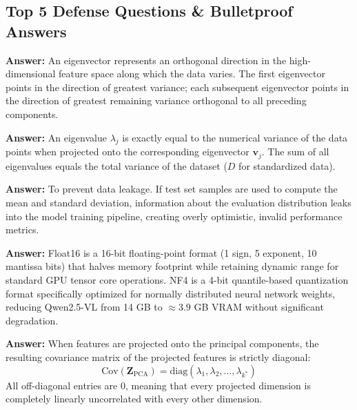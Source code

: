 \documentclass[11pt, a4paper]{article}
\begin{document}
\subsection{Top 5 Defense Questions \& Bulletproof Answers}

\begin{defensebox}
\textbf{Answer:} An eigenvector represents an orthogonal direction in the high-dimensional feature space along which the data varies. The first eigenvector points in the direction of greatest variance; each subsequent eigenvector points in the direction of greatest remaining variance orthogonal to all preceding components.
\end{defensebox}

\begin{defensebox}
\textbf{Answer:} An eigenvalue $\lambda_j$ is exactly equal to the numerical variance of the data points when projected onto the corresponding eigenvector $\mathbf{v}_j$. The sum of all eigenvalues equals the total variance of the dataset ($D$ for standardized data).
\end{defensebox}

\begin{defensebox}
\textbf{Answer:} To prevent data leakage. If test set samples are used to compute the mean and standard deviation, information about the evaluation distribution leaks into the model training pipeline, creating overly optimistic, invalid performance metrics.
\end{defensebox}

\begin{defensebox}
\textbf{Answer:} Float16 is a 16-bit floating-point format (1 sign, 5 exponent, 10 mantissa bits) that halves memory footprint while retaining dynamic range for standard GPU tensor core operations. NF4 is a 4-bit quantile-based quantization format specifically optimized for normally distributed neural network weights, reducing Qwen2.5-VL from 14 GB to $\approx 3.9$ GB VRAM without significant degradation.
\end{defensebox}

\begin{defensebox}
\textbf{Answer:} When features are projected onto the principal components, the resulting covariance matrix of the projected features is strictly diagonal:
$$\text{Cov}(\mathbf{Z}_{\text{PCA}}) = \text{diag}(\lambda_1, \lambda_2, \ldots, \lambda_{k^*})$$
All off-diagonal entries are 0, meaning that every projected dimension is completely linearly uncorrelated with every other dimension.
\end{defensebox}
\end{document}
